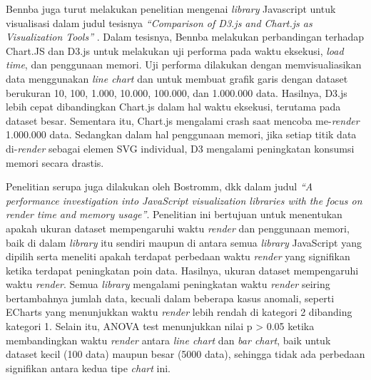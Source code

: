 Bennba juga turut melakukan penelitian mengenai \textit{library} Javascript untuk visualisasi dalam judul tesisnya \textit{“Comparison of D3.js and Chart.js as Visualization Tools”} \cite{Benbba2021}. Dalam tesisnya, Bennba melakukan perbandingan terhadap Chart.JS dan D3.js untuk melakukan uji performa pada waktu eksekusi, \textit{load time}, dan penggunaan memori. Uji performa dilakukan dengan memvisualiasikan data menggunakan \textit{line chart} dan untuk membuat grafik garis dengan dataset berukuran 10, 100, 1.000, 10.000, 100.000, dan 1.000.000 data. Hasilnya, D3.js lebih cepat dibandingkan Chart.js dalam hal waktu eksekusi, terutama pada dataset besar. Sementara itu, Chart.js mengalami crash saat mencoba me-\textit{render} 1.000.000 data. Sedangkan dalam hal penggunaan memori, jika setiap titik data di-\textit{render} sebagai elemen SVG individual, D3 mengalami  peningkatan konsumsi memori secara drastis.

Penelitian serupa juga dilakukan oleh Bostromm, dkk \cite{Bostrm2022} dalam judul \textit{“A performance investigation into JavaScript visualization libraries with the focus on render time and memory usage”}. Penelitian ini bertujuan untuk menentukan apakah ukuran dataset mempengaruhi waktu \textit{render} dan penggunaan memori, baik di dalam \textit{library} itu sendiri maupun di antara semua \textit{library} JavaScript yang dipilih serta meneliti apakah terdapat perbedaan waktu \textit{render} yang signifikan ketika terdapat peningkatan poin data. Hasilnya, ukuran dataset mempengaruhi waktu \textit{render}. Semua \textit{library} mengalami peningkatan waktu \textit{render} seiring bertambahnya jumlah data, kecuali dalam beberapa kasus anomali, seperti ECharts yang menunjukkan waktu \textit{render} lebih rendah di kategori 2 dibanding kategori 1. Selain itu, ANOVA test menunjukkan nilai p > 0.05 ketika membandingkan waktu \textit{render} antara \textit{line chart} dan \textit{bar chart}, baik untuk dataset kecil (100 data) maupun besar (5000 data), sehingga tidak ada perbedaan signifikan antara kedua tipe \textit{chart} ini. 

